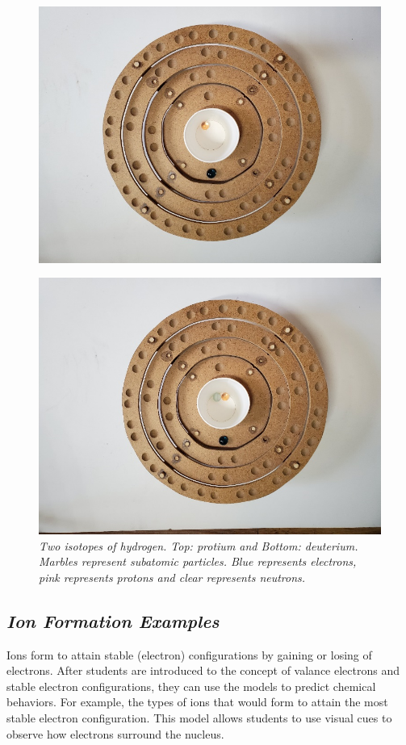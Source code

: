 \documentclass[11pt]{sig-alternate}
\begin{document}
\begin{large}
\begin{figure}[h!]
    \centering
    \includegraphics[width=\columnwidth]{figure 3_1.png}
\end{figure}
\begin{figure}[h!]
    \centering
    \includegraphics[width=\columnwidth]{figure 3_2.png}
    \captionsetup{font=large, labelfont=it}
    \caption{\textit{Two isotopes of hydrogen. Top: protium and Bottom: deuterium. Marbles represent subatomic particles. Blue represents electrons, pink represents protons and clear represents neutrons.}}
    \label{figure 3}
\end{figure}

\subsection*{\textit{Ion Formation Examples}}
Ions form to attain stable (electron) configurations by gaining or losing of electrons. After students are introduced to the concept of valance electrons and stable electron configurations, they can use the models to predict chemical behaviors. For example, the types of ions that would form to attain the most stable electron configuration. This model allows students to use visual cues to observe how electrons surround the nucleus.


\end{large}
\end{document}
